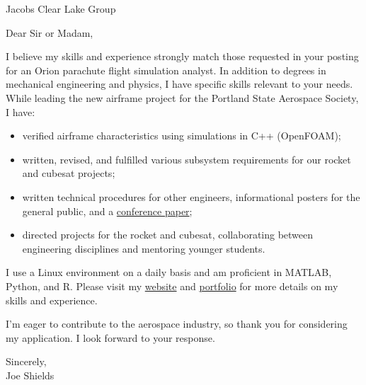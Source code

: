 \documentclass[letterpaper]{letter}
\begin{document}
\large

\begin{letter}{Jacobs Clear Lake Group}
\opening{Dear Sir or Madam,}

I believe my skills and experience strongly match those requested in your posting for an Orion parachute flight simulation analyst. 
In addition to degrees in mechanical engineering and physics, I have specific skills relevant to your needs.
While leading the new airframe project for the Portland State Aerospace Society, I have: 
\begin{itemize}
	\item verified airframe characteristics using simulations in C++ (OpenFOAM);
	\item written, revised, and fulfilled various subsystem requirements for our rocket and cubesat projects;
	\item written technical procedures for other engineers, informational posters for the general public, and a \href{http://arc.aiaa.org/doi/pdf/10.2514/6.2016-5365}{conference paper};
	\item directed projects for the rocket and cubesat, collaborating between engineering disciplines and mentoring younger students.
\end{itemize}
I use a Linux environment on a daily basis and am proficient in MATLAB, Python, and R.
Please visit my \href{http://joedang.github.io}{website} and \href{http://github.com/Joedang/Portfolio}{portfolio} for more details on my skills and experience.

I'm eager to contribute to the aerospace industry, so thank you for considering my application. I look forward to your response. 

\closing{Sincerely,\\ Joe Shields}
\end{letter}
\end{document}
